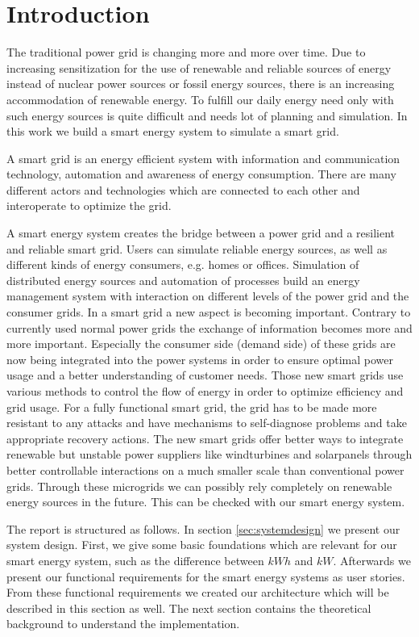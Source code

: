 \section{Introduction}

The traditional power grid is changing more and more over time.
Due to increasing sensitization for the use of renewable and reliable sources of energy instead of nuclear power sources or fossil energy sources, there is an increasing accommodation of renewable energy.
To fulfill our daily energy need only with such energy sources is quite difficult and needs lot of planning and simulation.
In this work we build a smart energy system to simulate a smart grid.

A smart grid is an energy efficient system with information and communication technology, automation and awareness of energy consumption.
There are many different actors and technologies which are connected to each other and interoperate to optimize the grid.

A smart energy system creates the bridge between a power grid and a resilient and reliable smart grid.
Users can simulate reliable energy sources, as well as different kinds of energy consumers, e.g. homes or offices.
Simulation of distributed energy sources and automation of processes build an energy management system with interaction on different levels of the power grid and the consumer grids.
In a smart grid a new aspect is becoming important.
Contrary to currently used normal power grids the exchange of information becomes more and more important.
Especially the consumer side (demand side) of these grids are now being integrated into the power systems in order to ensure optimal power usage and a better understanding of customer needs.
Those new smart grids use various methods to control the flow of energy in order to optimize efficiency and grid usage.
For a fully functional smart grid, the grid has to be made more resistant to any attacks and have mechanisms to self-diagnose problems and take appropriate recovery actions.
The new smart grids offer better ways to integrate renewable but unstable power suppliers like  windturbines and solarpanels through better controllable interactions on a much smaller scale than conventional power grids. 
Through these microgrids we can possibly rely completely on renewable energy sources in the future.
This can be checked with our smart energy system.

The report is structured as follows.
In section \ref{sec:systemdesign} we present our system design.
First, we give some basic foundations which are relevant for our smart energy system, such as the difference between $kWh$ and $kW$.
Afterwards we present our functional requirements for the smart energy systems as user stories.
From these functional requirements we created our architecture which will be described in this section as well. The next section contains the theoretical background to understand the implementation.

